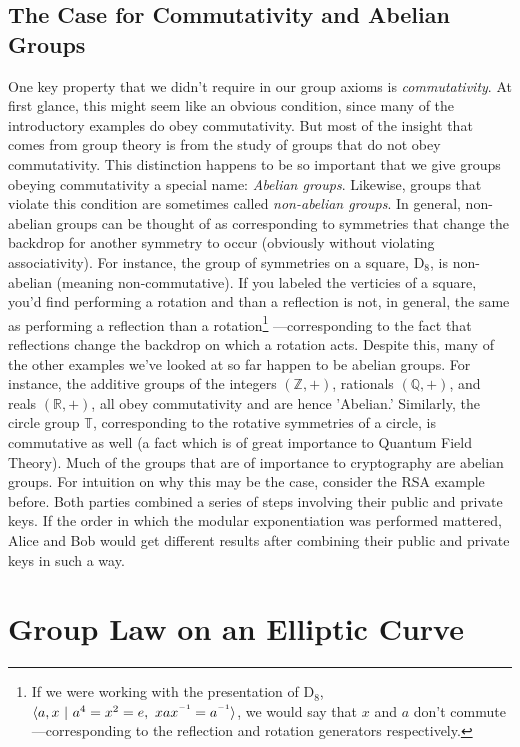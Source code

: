 \documentclass[11pt, a4paper]{report}
\newcommand{\inv}{^{\raisebox{.2em}{$\scriptscriptstyle-1$}}}
\newcommand{\reals}{\mathbb{R}}
\begin{document}
\subsection{The Case for Commutativity and Abelian Groups}
One key property that we didn't require in our group axioms is \textit{commutativity}. At first glance, this might seem like an obvious condition, since many of the introductory examples do obey commutativity. But most of the insight that comes from group theory is from the study of groups that do not obey commutativity. This distinction happens to be so important that we give groups obeying commutativity a special name: \textit{Abelian groups}.\autocite[17]{dummit} Likewise, groups that violate this condition are sometimes called \textit{non-abelian groups}. In general, non-abelian groups can be thought of as corresponding to symmetries that change the backdrop for another symmetry to occur (obviously without violating associativity). For instance, the group of symmetries on a square, $\mathrm{D}_8$, is non-abelian (meaning non-commutative). If you labeled the verticies of a square, you'd find performing a rotation and than a reflection is not, in general, the same as performing a reflection than a rotation\footnote[0]{If we were working with the presentation of $\mathrm{D}_8$, $\langle a,x\ \vert \ a^4 = x^2 = e,\ xax\inv = a\inv \rangle$, we would say that $x$ and $a$ don't commute—corresponding to the reflection and rotation generators respectively.}
—corresponding to the fact that reflections change the backdrop on which a rotation acts. Despite this, many of the other examples we've looked at so far happen to be abelian groups. For instance, the additive groups of the integers $(\mathbb{Z},+)$, rationals $(\mathbb{Q},+)$, and reals $(\reals, +)$, all obey commutativity and are hence 'Abelian.' Similarly, the circle group $\mathbb{T}$, corresponding to the rotative symmetries of a circle, is commutative as well (a fact which is of great importance to Quantum Field Theory).
  Much of the groups that are of importance to cryptography are abelian groups. For intuition on why this may be the case, consider the RSA example before. Both parties combined a series of steps involving their public and private keys. If the order in which the modular exponentiation was performed mattered, Alice and Bob would get different results after combining their public and private keys in such a way.

\section{Group Law on an Elliptic Curve}
\end{document}
